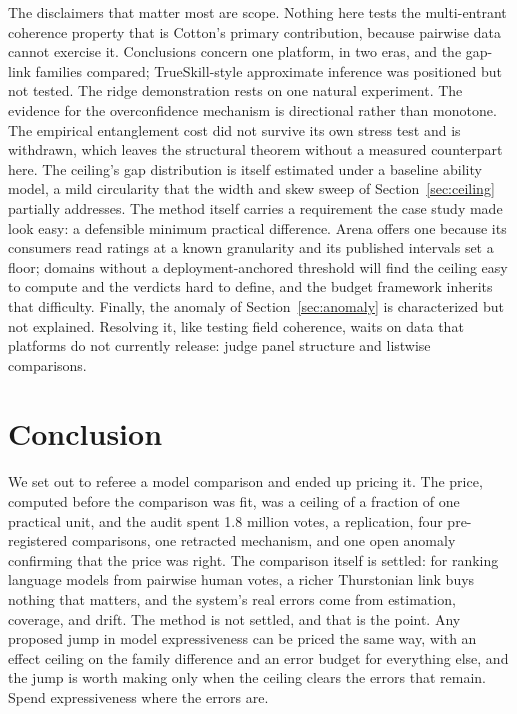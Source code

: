 \documentclass[10pt]{article}
\begin{document}
The disclaimers that matter most are scope. Nothing here tests the
multi-entrant coherence property that is Cotton's primary
contribution, because pairwise data cannot exercise it. Conclusions
concern one platform, in two eras, and the gap-link families compared;
TrueSkill-style approximate inference was positioned but not tested.
The ridge demonstration rests on one natural experiment. The evidence
for the overconfidence mechanism is directional rather than monotone.
The empirical entanglement cost did not survive its own stress test
and is withdrawn, which leaves the structural theorem without a
measured counterpart here. The ceiling's gap
distribution is itself estimated under a baseline ability model, a
mild circularity that the width and skew sweep of
Section~\ref{sec:ceiling} partially addresses. The method itself
carries a requirement the
case study made look easy: a defensible minimum practical difference.
Arena offers one because its consumers read ratings at a known
granularity and its published intervals set a floor; domains without a
deployment-anchored threshold will find the ceiling easy to compute
and the verdicts hard to define, and the budget framework inherits
that difficulty. Finally, the anomaly of Section~\ref{sec:anomaly} is
characterized but not explained. Resolving it, like testing field
coherence, waits on data that platforms do not currently release:
judge panel structure and listwise comparisons.

\section{Conclusion}

We set out to referee a model comparison and ended up pricing it.
The price, computed before the comparison was fit, was a ceiling of
a fraction of one practical unit, and the audit spent 1.8 million votes, a
replication, four pre-registered comparisons, one retracted
mechanism, and one open anomaly confirming that the price was
right. The comparison itself is settled: for ranking language
models from pairwise human votes, a richer Thurstonian link buys
nothing that matters, and the system's real errors come from
estimation, coverage, and drift. The method is not settled, and
that is the point. Any proposed jump in model expressiveness can be
priced the same way, with an effect ceiling on the family
difference and an error budget for everything else, and the jump is
worth making only when the ceiling clears the errors that remain.
Spend expressiveness where the errors are.
\end{document}
